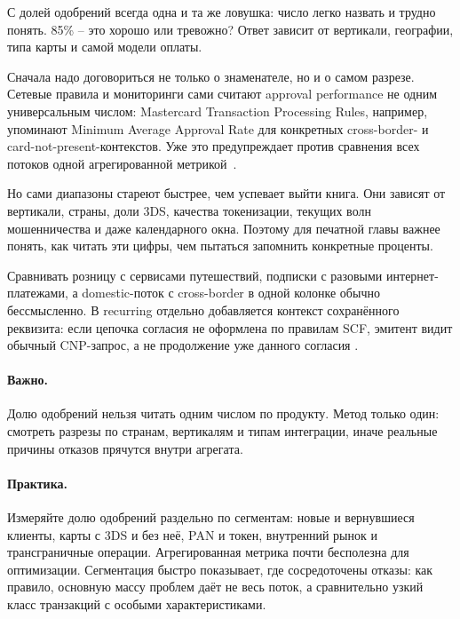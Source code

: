 С долей одобрений всегда одна и та же ловушка: число легко назвать и
трудно понять. 85\% -- это хорошо или тревожно? Ответ зависит от
вертикали, географии, типа карты и самой модели оплаты.

Сначала надо договориться не только о знаменателе, но и о самом
разрезе. Сетевые правила и мониторинги сами считают approval
performance не одним универсальным числом: Mastercard Transaction
Processing Rules, например, упоминают Minimum Average Approval Rate для
конкретных cross-border- и card-not-present-контекстов. Уже это
предупреждает против сравнения всех потоков одной агрегированной
метрикой~\cite{mc-tpr}.

Но сами диапазоны стареют быстрее, чем успевает выйти книга. Они
зависят от вертикали, страны, доли 3DS, качества токенизации, текущих
волн мошенничества и даже календарного окна. Поэтому для печатной
главы важнее понять, как читать эти цифры, чем пытаться запомнить
конкретные проценты.

Сравнивать розницу с сервисами путешествий, подписки с разовыми
интернет-платежами, а domestic-поток с cross-border в одной колонке
обычно бессмысленно. В recurring отдельно добавляется контекст
сохранённого реквизита: если цепочка согласия не оформлена по правилам SCF, эмитент
видит обычный CNP-запрос, а не продолжение уже данного согласия
\cite{visa-scf}\cite{mc-scf}.

\paragraph{Важно.}
Долю одобрений нельзя читать одним числом по продукту. Метод только один: смотреть разрезы по странам, вертикалям и типам интеграции, иначе реальные причины отказов прячутся внутри агрегата.


\paragraph{Практика.}
  Измеряйте долю одобрений раздельно по сегментам: новые и вернувшиеся
  клиенты, карты с 3DS и без неё, PAN и токен, внутренний рынок и
  трансграничные операции. Агрегированная метрика почти бесполезна для
  оптимизации. Сегментация быстро показывает, где сосредоточены
  отказы: как правило, основную массу проблем даёт не весь поток, а
  сравнительно узкий класс транзакций с особыми характеристиками.


